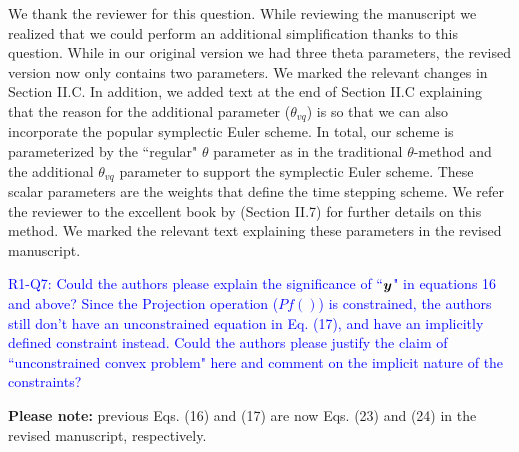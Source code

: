 We thank the reviewer for this question. While reviewing the manuscript we
realized that we could perform an additional simplification thanks to this
question. While in our original version we had three theta parameters, the
revised version now only contains two parameters. We marked the relevant changes
in Section II.C. In addition, we added text at the end of Section II.C
explaining that the reason for the additional parameter ($\theta_{vq}$) is so
that we can also incorporate the popular symplectic Euler scheme. In total, our
scheme is parameterized by the ``regular" $\theta$ parameter as in the
traditional $\theta$-method and the additional $\theta_{vq}$ parameter to
support the symplectic Euler scheme. These scalar parameters are the weights
that define the time stepping scheme. We refer the reviewer to the excellent
book by
\cite{bib:hairer2008solving}
(Section II.7) for further details on this method. We marked the relevant text
explaining these parameters in the revised manuscript.
\vspace{5mm}

\textcolor{blue}{R1-Q7: Could the authors please explain the significance of
``${\bm{y}}$" in equations 16 and above? Since the Projection operation ($Pf()$)
is constrained, the authors still don't have an unconstrained equation in Eq.
(17), and have an implicitly defined constraint instead. Could the authors
please justify the claim of ``unconstrained convex problem" here and comment on
the implicit nature of the constraints?}

\textbf{Please note:} previous Eqs. (16) and (17) are now Eqs. (23) and (24)
in the revised manuscript, respectively.

